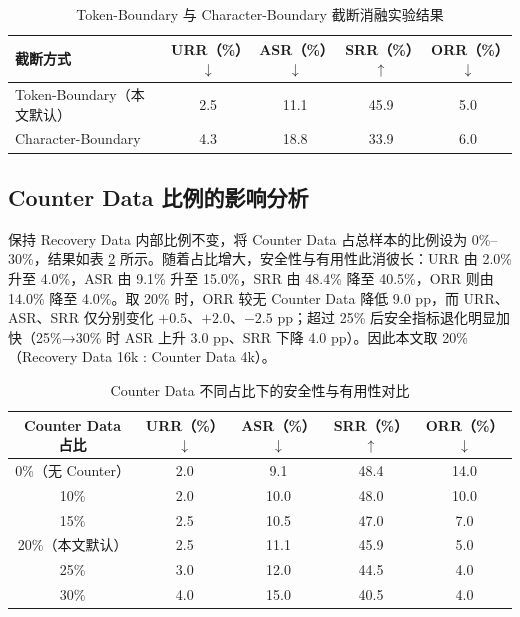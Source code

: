 \documentclass[fontset=fandol,type=master,campus=shenzhen,etitleauto=true]{hithesisbook}
\begin{document}
\begin{table}[htbp]
\centering
\caption{Token-Boundary 与 Character-Boundary 截断消融实验结果}
\label{tab:token-char-ablation}
\small
\renewcommand{\arraystretch}{1.1}
\begin{tabular}{l c c c c}
\toprule
\textbf{截断方式} & \textbf{URR（\%）$\downarrow$} & \textbf{ASR（\%）$\downarrow$} & \textbf{SRR（\%）$\uparrow$} & \textbf{ORR（\%）$\downarrow$} \\
\midrule
Token-Boundary（本文默认） & 2.5 & 11.1 & 45.9 & 5.0 \\
Character-Boundary & 4.3 & 18.8 & 33.9 & 6.0 \\
\bottomrule
\end{tabular}
\end{table}

\subsection{Counter Data 比例的影响分析}\label{counter-data-ux6bd4ux4f8bux7684ux5f71ux54cdux5206ux6790}

保持 Recovery Data 内部比例不变，将 Counter Data 占总样本的比例设为 0\%--30\%，结果如表 \ref{tab:counter-ratio} 所示。随着占比增大，安全性与有用性此消彼长：URR 由 2.0\% 升至 4.0\%，ASR 由 9.1\% 升至 15.0\%，SRR 由 48.4\% 降至 40.5\%，ORR 则由 14.0\% 降至 4.0\%。取 20\% 时，ORR 较无 Counter Data 降低 9.0 pp，而 URR、ASR、SRR 仅分别变化 $+0.5$、$+2.0$、$-2.5$ pp；超过 25\% 后安全指标退化明显加快（25\%→30\% 时 ASR 上升 3.0 pp、SRR 下降 4.0 pp）。因此本文取 20\%（Recovery Data 16k : Counter Data 4k）。

\begin{table}[htbp]
\centering
\caption{Counter Data 不同占比下的安全性与有用性对比}
\label{tab:counter-ratio}
\small
\renewcommand{\arraystretch}{1.1}
\begin{tabular}{c c c c c}
\toprule
\textbf{Counter Data 占比} & \textbf{URR（\%）$\downarrow$} & \textbf{ASR（\%）$\downarrow$} & \textbf{SRR（\%）$\uparrow$} & \textbf{ORR（\%）$\downarrow$} \\
\midrule
0\%（无 Counter） & 2.0 & 9.1 & 48.4 & 14.0 \\
10\% & 2.0 & 10.0 & 48.0 & 10.0 \\
15\% & 2.5 & 10.5 & 47.0 & 7.0 \\
20\%（本文默认） & 2.5 & 11.1 & 45.9 & 5.0 \\
25\% & 3.0 & 12.0 & 44.5 & 4.0 \\
30\% & 4.0 & 15.0 & 40.5 & 4.0 \\
\bottomrule
\end{tabular}
\end{table}
\end{document}

